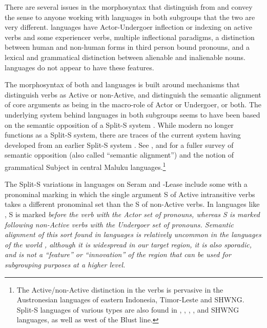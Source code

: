 \clearpage
{}
There are several issues in the morphosyntax that distinguish
 from  and convey the sense to anyone working with languages in both
subgroups that the two are very different.
 languages have Actor-Undergoer inflection or
indexing on active verbs
and some experiencer verbs,
multiple inflectional paradigms, a distinction between human
and non-human forms in third person bound pronouns,
and a lexical and grammatical distinction between alienable and inalienable nouns.
 languages do not appear to have these features.

The morphosyntax of both 
and  languages is built around mechanisms that
distinguish verbs as Active or non-Active,
and distinguish the semantic alignment of core arguments as being
in the macro-role of Actor or Undergoer, or both.
The underlying system behind languages in both subgroups seems
to have been based on the semantic opposition of a Split-S system \citep{Dixon1994}.
While modern  no longer functions as a Split-S system,
there are traces of the current system having developed from
an earlier Split-S system \citep[156--159]{Grimes1991c}.
See \citet{Ewing2010}, and \citet{Grimes2024} for a fuller survey
of semantic opposition (also called ``semantic alignment'')
and the notion of grammatical Subject in central Maluku languages.\footnote{
		The Active/non-Active distinction in the verbs is pervasive in the
		Austronesian languages of eastern Indonesia, Timor-Leste and SHWNG.
		Split-S languages of various types are also found in ,
		, , ,
		and SHWNG languages, as well as west of the Blust line.}

The Split-S variations in  languages on Seram
and -Lease include some with a pronominal marking in which
the single argument S of Active intransitive verbs takes a different
pronominal set than the S of non-Active verbs.
In languages like ,
S is marked \it{before} the verb with the Actor set of pronouns,
whereas S is marked \it{following} non-Active verbs with the
Undergoer set of pronouns.
Semantic alignment of this sort found in  languages
is relatively uncommon in the languages of the world \citep{Siewierska2013},
although it is widespread in our target region,
it is also sporadic,
and is not a “feature” or “innovation” of the region that can
be used for subgrouping purposes at a higher level.

